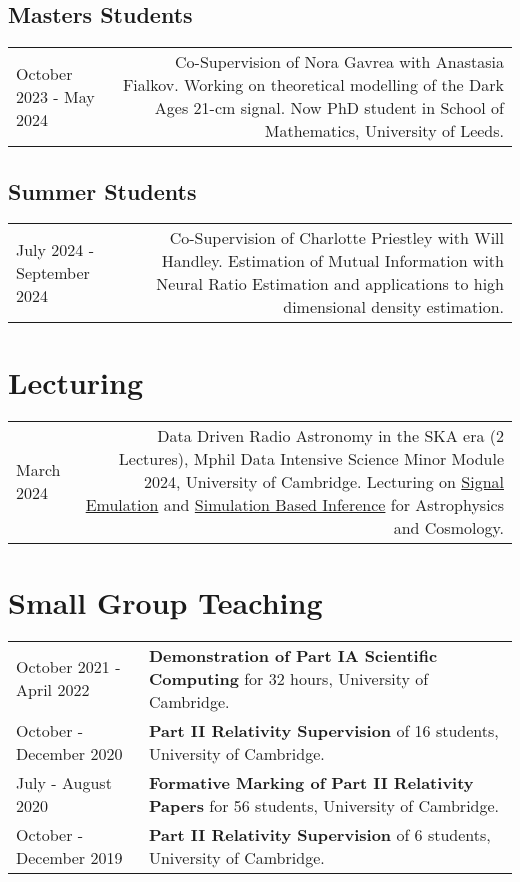 \documentclass{article}
\begin{document}
\subsection*{Masters Students}

\begin{tabular}{L!{\vrule}R}
    October 2023 - May 2024 & Co-Supervision of Nora Gavrea with Anastasia Fialkov. Working on theoretical modelling of the Dark Ages 21-cm signal. Now PhD student in School of Mathematics, University of Leeds. \\
\end{tabular}

\subsection*{Summer Students}

\begin{tabular}{L!{\vrule}R}
    July 2024 - September 2024 & Co-Supervision of Charlotte Priestley  with Will Handley. Estimation of Mutual Information with Neural Ratio Estimation and applications to high dimensional density estimation. \\
\end{tabular}

\section*{Lecturing}

\begin{tabular}{L!{\vrule}R}
    March 2024 & Data Driven Radio Astronomy in the SKA era (2 Lectures), Mphil Data Intensive Science Minor Module 2024, University of Cambridge. Lecturing on \href{https://github.com/htjb/Talks/raw/master/Lectures/MPhil_Data_Intensive_Science_Lectures_2024/Lecture-15.pdf}{Signal Emulation} and \href{https://github.com/htjb/Talks/raw/master/Lectures/MPhil_Data_Intensive_Science_Lectures_2024/Lecture-16.pdf}{Simulation Based Inference} for Astrophysics and Cosmology.
\end{tabular}

\section*{Small Group Teaching}

\begin{tabular}{>{\raggedleft}p{}!{\vrule}p{0.76\textwidth}}
	October 2021 - April 2022 & \textbf{Demonstration of Part IA Scientific Computing} for 32 hours, University of Cambridge.\\
	October - December 2020 & \textbf{Part II Relativity Supervision} of 16 students,  University of Cambridge. \\
	July - August 2020 & \textbf{Formative Marking of Part II Relativity Papers} for 56 students, University of Cambridge. \\
	October - December 2019 & \textbf{Part II Relativity Supervision} of 6 students, University of Cambridge.
\end{tabular}
\end{document}
